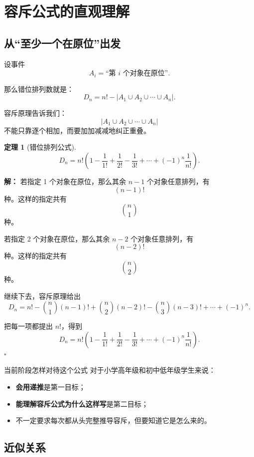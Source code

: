 \documentclass[11pt,a4paper,fontset=fandol]{ctexart}
\theoremstyle{formaltheorem}
\newtheorem{theorem}{定理}[section]
\theoremstyle{formalexample}
\newenvironment{solution}{\par\noindent\textbf{解：}}{\hfill$\square$\par}
\newcommand{\Dn}{D_n}
\begin{document}
\section{容斥公式的直观理解}

\subsection{从“至少一个在原位”出发}

设事件
\[
A_i=\text{“第 }i\text{ 个对象在原位”}.
\]

那么错位排列数就是：
\[
\Dn=n!-\bigl|A_1\cup A_2\cup \cdots \cup A_n\bigr|.
\]

容斥原理告诉我们：
\[
\left|A_1\cup A_2\cup \cdots \cup A_n\right|
\]
不能只靠逐个相加，而要加加减减地纠正重叠。

\begin{theorem}[错位排列公式]
\[
\Dn=n!\left(1-\frac1{1!}+\frac1{2!}-\frac1{3!}+\cdots+(-1)^n\frac1{n!}\right).
\]
\end{theorem}

\begin{solution}
若指定 1 个对象在原位，那么其余 $n-1$ 个对象任意排列，有
\[
(n-1)!
\]
种。这样的指定共有
\[
\binom{n}{1}
\]
种。

若指定 2 个对象在原位，那么其余 $n-2$ 个对象任意排列，有
\[
(n-2)!
\]
种。这样的指定共有
\[
\binom{n}{2}
\]
种。

继续下去，容斥原理给出
\[
\Dn=n!-\binom{n}{1}(n-1)!+\binom{n}{2}(n-2)!-\binom{n}{3}(n-3)!+\cdots+(-1)^n.
\]

把每一项都提出 $n!$，得到
\[
\Dn=n!\left(1-\frac1{1!}+\frac1{2!}-\frac1{3!}+\cdots+(-1)^n\frac1{n!}\right).
\]
\end{solution}

\begin{notebox}{当前阶段怎样对待这个公式}
对于小学高年级和初中低年级学生来说：
\begin{itemize}
  \item \textbf{会用递推}是第一目标；
  \item \textbf{能理解容斥公式为什么这样写}是第二目标；
  \item 不一定要求每次都从头完整推导容斥，但要知道它是怎么来的。
\end{itemize}
\end{notebox}

\subsection{近似关系}
\end{document}
